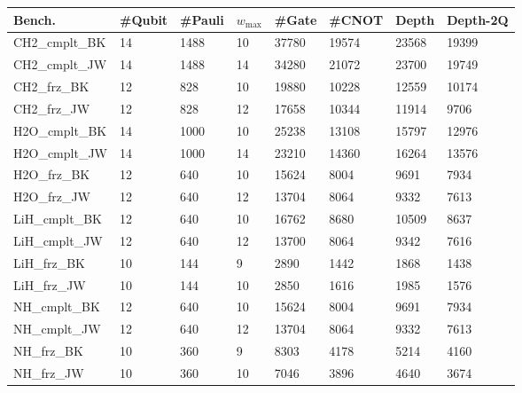 \begin{tabular}{llllllll}
\toprule
Bench. & \#Qubit & #Pauli & $w_\max$ & \#Gate & \#CNOT  & Depth & Depth-2Q \\
\midrule
CH2\_cmplt\_BK & 14 & 1488 & 10 & 37780 & 19574 & 23568 & 19399 \\
CH2\_cmplt\_JW & 14 & 1488 & 14 & 34280 & 21072 & 23700 & 19749 \\
CH2\_frz\_BK & 12 & 828 & 10 & 19880 & 10228 & 12559 & 10174 \\
CH2\_frz\_JW & 12 & 828 & 12 & 17658 & 10344 & 11914 & 9706 \\
H2O\_cmplt\_BK & 14 & 1000 & 10 & 25238 & 13108 & 15797 & 12976 \\
H2O\_cmplt\_JW & 14 & 1000 & 14 & 23210 & 14360 & 16264 & 13576 \\
H2O\_frz\_BK & 12 & 640 & 10 & 15624 & 8004 & 9691 & 7934 \\
H2O\_frz\_JW & 12 & 640 & 12 & 13704 & 8064 & 9332 & 7613 \\
LiH\_cmplt\_BK & 12 & 640 & 10 & 16762 & 8680 & 10509 & 8637 \\
LiH\_cmplt\_JW & 12 & 640 & 12 & 13700 & 8064 & 9342 & 7616 \\
LiH\_frz\_BK & 10 & 144 & 9 & 2890 & 1442 & 1868 & 1438 \\
LiH\_frz\_JW & 10 & 144 & 10 & 2850 & 1616 & 1985 & 1576 \\
NH\_cmplt\_BK & 12 & 640 & 10 & 15624 & 8004 & 9691 & 7934 \\
NH\_cmplt\_JW & 12 & 640 & 12 & 13704 & 8064 & 9332 & 7613 \\
NH\_frz\_BK & 10 & 360 & 9 & 8303 & 4178 & 5214 & 4160 \\
NH\_frz\_JW & 10 & 360 & 10 & 7046 & 3896 & 4640 & 3674 \\
\bottomrule
\end{tabular}
